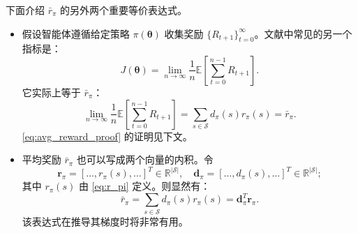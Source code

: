 \documentclass[UTF8]{article}
\begin{document}
下面介绍 $\bar{r}_\pi$ 的另外两个重要等价表达式。

\begin{itemize}
    \item 假设智能体遵循给定策略 $\pi(\boldsymbol{\theta})$ 收集奖励 $\{R_{t+1}\}_{t=0}^{\infty}$。文献中常见的另一个指标是：
    \begin{equation}
    J(\boldsymbol{\theta}) = \lim_{n \to \infty} \frac{1}{n} \mathbb{E}\left[ \sum_{t=0}^{n-1} R_{t+1} \right]. \label{eq:J_undiscounted}
    \end{equation}
    它实际上等于 $\bar{r}_\pi$：
    \begin{equation}
    \lim_{n \to \infty} \frac{1}{n} \mathbb{E}\left[ \sum_{t=0}^{n-1} R_{t+1} \right]
    = \sum_{s \in \mathcal{S}} d_\pi(s) r_\pi(s) = \bar{r}_\pi. \label{eq:avg_reward_proof}
    \end{equation}
    \eqref{eq:avg_reward_proof} 的证明见下文。
    \item 平均奖励 $\bar{r}_\pi$ 也可以写成两个向量的内积。令
    \[
    \boldsymbol{r}_\pi = [\dots, r_\pi(s), \dots]^T \in \mathbb{R}^{|\mathcal{S}|}, \quad
    \boldsymbol{d}_\pi = [\dots, d_\pi(s), \dots]^T \in \mathbb{R}^{|\mathcal{S}|};
    \]
    其中 $r_\pi(s)$ 由 \eqref{eq:r_pi} 定义。则显然有：
    \[
    \bar{r}_\pi = \sum_{s \in \mathcal{S}} d_\pi(s) r_\pi(s) = \boldsymbol{d}_\pi^T \boldsymbol{r}_\pi.
    \]
    该表达式在推导其梯度时将非常有用。
\end{itemize}
\end{document}
